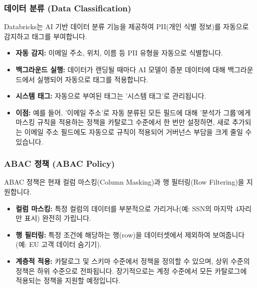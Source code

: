 \documentclass[11pt,a4paper]{article}
\begin{document}
\subsubsection*{데이터 분류 (Data Classification)}
Databricks는 AI 기반 데이터 분류 기능을 제공하여 PII(개인 식별 정보)를 자동으로 감지하고 태그를 부여합니다.
\begin{itemize}
    \item \textbf{자동 감지:} 이메일 주소, 위치, 이름 등 PII 유형을 자동으로 식별합니다.
    \item \textbf{백그라운드 실행:} 데이터가 랜딩될 때마다 AI 모델이 증분 데이터에 대해 백그라운드에서 실행되어 자동으로 태그를 적용합니다.
    \item \textbf{시스템 태그:} 자동으로 부여된 태그는 '시스템 태그'로 관리됩니다.
    \item \textbf{이점:} 예를 들어, '이메일 주소'로 자동 분류된 모든 필드에 대해 '분석가 그룹'에게 마스킹 규칙을 적용하는 정책을 카탈로그 수준에서 한 번만 설정하면, 새로 추가되는 이메일 주소 필드에도 자동으로 규칙이 적용되어 거버넌스 부담을 크게 줄일 수 있습니다.
\end{itemize}

\subsubsection*{ABAC 정책 (ABAC Policy)}
ABAC 정책은 현재 컬럼 마스킹(Column Masking)과 행 필터링(Row Filtering)을 지원합니다.
\begin{itemize}
    \item \textbf{컬럼 마스킹:} 특정 컬럼의 데이터를 부분적으로 가리거나(예: SSN의 마지막 4자리만 표시) 완전히 가립니다.
    \item \textbf{행 필터링:} 특정 조건에 해당하는 행(row)을 데이터셋에서 제외하여 보여줍니다 (예: EU 고객 데이터 숨기기).
    \item \textbf{계층적 적용:} 카탈로그 및 스키마 수준에서 정책을 정의할 수 있으며, 상위 수준의 정책은 하위 수준으로 전파됩니다. 장기적으로는 계정 수준에서 모든 카탈로그에 적용되는 정책을 지원할 예정입니다.
\end{itemize}
\end{document}
